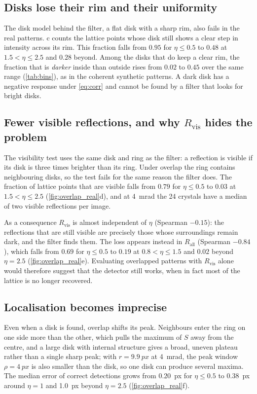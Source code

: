 \documentclass[11pt,a4paper]{article}
\newcommand{\Rvis}{R_{\mathrm{vis}}}
\newcommand{\Rall}{R_{\mathrm{all}}}
\begin{document}
\subsection{Disks lose their rim and their uniformity}
The disk model behind the filter, a flat disk with a sharp rim, also fails in the real patterns. c
counts the lattice points whose disk still shows a clear step in intensity across its rim. This fraction falls from
$0.95$ for $\eta \le 0.5$ to $0.48$ at $1.5 < \eta \le 2.5$ and $0.28$ beyond. Among the disks that do keep a clear rim,
the fraction that is \emph{darker} inside than outside rises from $0.02$ to $0.45$ over the same range (\cref{tab:bins}), as
in the coherent synthetic patterns. A dark disk has a negative response under \cref{eq:corr} and cannot be found by a
filter that looks for bright disks.

\subsection{Fewer visible reflections, and why \texorpdfstring{$\Rvis$}{R\_vis} hides the problem}\label{sec:visible}
The visibility test uses the same disk and ring as the filter: a reflection is visible if its disk is three times brighter
than its ring. Under overlap the ring contains neighbouring disks, so the test fails for the same reason the filter does.
The fraction of lattice points that are visible falls from $0.79$ for $\eta \le 0.5$ to $0.03$ at $1.5 < \eta \le 2.5$
(\cref{fig:overlap_real}d), and at \SI{4}{\milli\radian} the 24 crystals have a median of two visible reflections per
image.

As a consequence $\Rvis$ is almost independent of $\eta$ (Spearman $-0.15$): the reflections that are still visible are
precisely those whose surroundings remain dark, and the filter finds them. The loss appears instead in $\Rall$
(Spearman $-0.84$), which falls from $0.69$ for $\eta \le 0.5$ to $0.19$ at $0.8 < \eta \le 1.5$ and $0.02$ beyond
$\eta = 2.5$ (\cref{fig:overlap_real}e). Evaluating overlapped patterns with $\Rvis$ alone would therefore suggest that the
detector still works, when in fact most of the lattice is no longer recovered.

\subsection{Localisation becomes imprecise}
Even when a disk is found, overlap shifts its peak. Neighbours enter the ring on one side more than the other, which pulls
the maximum of $S$ away from the centre, and a large disk with internal structure gives a broad, uneven plateau rather than
a single sharp peak; with $r = \SI{9.9}{px}$ at \SI{4}{\milli\radian}, the peak window $\rho = \SI{4}{px}$ is also smaller
than the disk, so one disk can produce several maxima. The median error of correct detections grows from \SI{0.20}{px} for
$\eta \le 0.5$ to \SI{0.38}{px} around $\eta = 1$ and \SI{1.0}{px} beyond $\eta = 2.5$ (\cref{fig:overlap_real}f).
\end{document}
